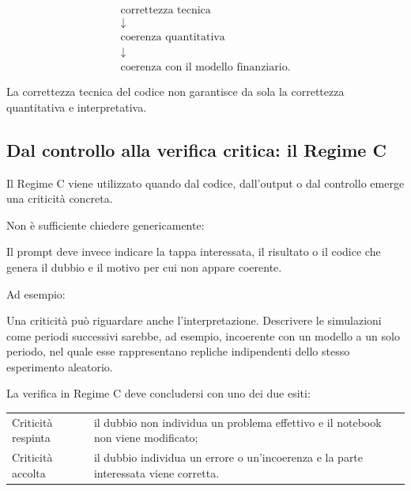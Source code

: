 \[
\begin{array}{c}
\text{correttezza tecnica}
\\[3pt]
\downarrow
\\[3pt]
\text{coerenza quantitativa}
\\[3pt]
\downarrow
\\[3pt]
\text{coerenza con il modello finanziario}.
\end{array}
\]

La correttezza tecnica del codice non garantisce da sola la correttezza
quantitativa e interpretativa.

\subsection{Dal controllo alla verifica critica: il Regime C}

Il Regime C viene utilizzato quando dal codice, dall'output o dal controllo
emerge una criticit\`{a} concreta.

Non \`{e} sufficiente chiedere genericamente:

\begin{quote}
\small
{}
\end{quote}

Il prompt deve invece indicare la tappa interessata, il risultato o il codice
che genera il dubbio e il motivo per cui non appare coerente.

Ad esempio:

\begin{quote}
\small
{}
\end{quote}

Una criticit\`{a} pu\`{o} riguardare anche l'interpretazione. Descrivere le
simulazioni come periodi successivi sarebbe, ad esempio, incoerente con un
modello a un solo periodo, nel quale esse rappresentano repliche indipendenti
dello stesso esperimento aleatorio.

La verifica in Regime C deve concludersi con uno dei due esiti:

\begin{center}
\begin{tabular}{p{3.5cm}p{8.0cm}}
Criticit\`{a} respinta &
il dubbio non individua un problema effettivo e il notebook non viene
modificato; \\[4pt]

Criticit\`{a} accolta &
il dubbio individua un errore o un'incoerenza e la parte interessata viene
corretta.
\end{tabular}
\end{center}

